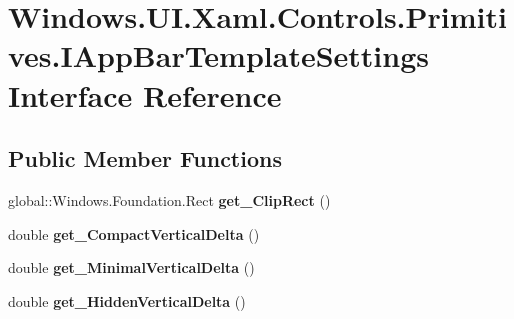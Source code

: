 \hypertarget{interface_windows_1_1_u_i_1_1_xaml_1_1_controls_1_1_primitives_1_1_i_app_bar_template_settings}{}\section{Windows.\+U\+I.\+Xaml.\+Controls.\+Primitives.\+I\+App\+Bar\+Template\+Settings Interface Reference}
\label{interface_windows_1_1_u_i_1_1_xaml_1_1_controls_1_1_primitives_1_1_i_app_bar_template_settings}
\subsection*{Public Member Functions}
\begin{DoxyCompactItemize}
\item 
\mbox{\label{interface_windows_1_1_u_i_1_1_xaml_1_1_controls_1_1_primitives_1_1_i_app_bar_template_settings_a1477fc2cabe65647982871428ccb92d6}} 
global\+::\+Windows.\+Foundation.\+Rect {\bfseries get\+\_\+\+Clip\+Rect} ()
\item 
\mbox{\label{interface_windows_1_1_u_i_1_1_xaml_1_1_controls_1_1_primitives_1_1_i_app_bar_template_settings_a9284f5a8ecd5fe94f41586d1f31440b7}} 
double {\bfseries get\+\_\+\+Compact\+Vertical\+Delta} ()
\item 
\mbox{\label{interface_windows_1_1_u_i_1_1_xaml_1_1_controls_1_1_primitives_1_1_i_app_bar_template_settings_a80e9a668a3d67609efe7d0b77fb1f1f6}} 
double {\bfseries get\+\_\+\+Minimal\+Vertical\+Delta} ()
\item 
\mbox{\label{interface_windows_1_1_u_i_1_1_xaml_1_1_controls_1_1_primitives_1_1_i_app_bar_template_settings_a72937a4b4d9cbf3a2445533f0c7c350b}} 
double {\bfseries get\+\_\+\+Hidden\+Vertical\+Delta} ()
\item 
\mbox{\label{interface_windows_1_1_u_i_1_1_xaml_1_1_controls_1_1_primitives_1_1_i_app_bar_template_settings_a1477fc2cabe65647982871428ccb92d6}} 

\end{DoxyCompactItemize}
